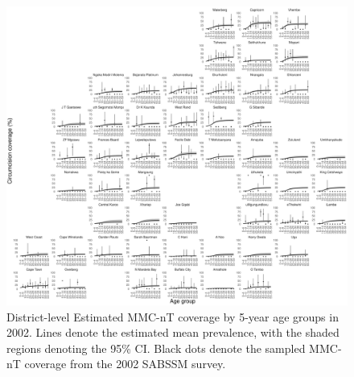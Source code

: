 \documentclass{article}
\begin{document}
\begin{appendix}

\begin{figure}[H]
	\centering
	\includegraphics[width = \linewidth]{Figures/suppmat/ModelFit/MMCnTPrev_5year_District_2002_withsurveypoints}
	\caption{District-level Estimated MMC-nT coverage by 5-year age groups in 2002. Lines denote the estimated mean prevalence, with the shaded regions denoting the 95\% CI. Black dots denote the sampled MMC-nT coverage from the 2002 SABSSM survey.}
\end{figure}



\end{appendix}
\end{document}
